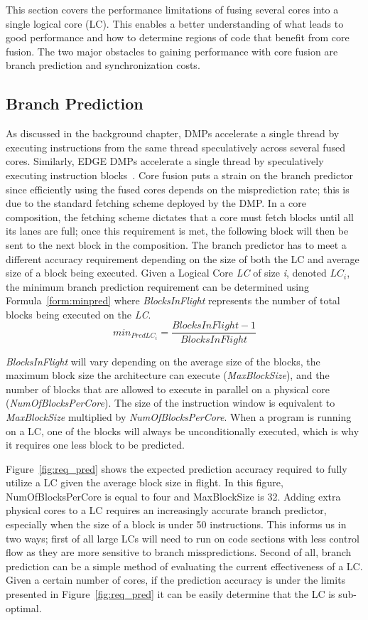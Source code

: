 This section covers the performance limitations of fusing several cores into a single logical core (LC).
This enables a better understanding of what leads to good performance and how to determine regions of code that benefit from core fusion.
The two major obstacles to gaining performance with core fusion are branch prediction and synchronization costs.

\subsection{Branch Prediction}

As discussed in the background chapter, DMPs accelerate a single thread by executing instructions from the same thread speculatively across several fused cores. 
Similarly, EDGE DMPs accelerate a single thread by speculatively executing instruction blocks~\cite{putnam2010e2}.
Core fusion puts a strain on the branch predictor since efficiently using the fused cores depends on the misprediction rate; this is due to the standard fetching scheme deployed by the DMP.
In a core composition, the fetching scheme dictates that a core must fetch blocks until all its lanes are full; once this requirement is met, the following block will then be sent to the next block in the composition.
The branch predictor has to meet a different accuracy requirement depending on the size of both the LC and average size of a block being executed.
Given a Logical Core \textit{LC} of size \textit{i}, denoted \textit{$LC_i$}, the minimum branch prediction requirement can be determined using Formula~\ref{form:minpred} where \textit{BlocksInFlight} represents the number of total blocks being executed on the \textit{LC}.
\begin{equation}\label{form:minpred}
min_{PredLC_i }= \frac{BlocksInFlight - 1}{BlocksInFlight}
\end{equation}

\textit{BlocksInFlight} will vary depending on the average size of the blocks, the maximum block size the architecture can execute (\textit{MaxBlockSize}), and the number of blocks 
that are allowed to execute in parallel on a physical core (\textit{NumOfBlocksPerCore}). 
The size of the instruction window is equivalent to \textit{MaxBlockSize} multiplied by \textit{NumOfBlocksPerCore}.
When a program is running on a LC, one of the blocks will always be unconditionally executed, which is why it requires one less block to be predicted.

Figure~\ref{fig:req_pred} shows the expected prediction accuracy required to fully utilize a LC given the average block size in flight.
In this figure, NumOfBlocksPerCore is equal to four and MaxBlockSize is 32.
Adding extra physical cores to a LC requires an increasingly accurate branch predictor, especially when the size of a block is under 50 instructions.
This informs us in two ways; first of all large LCs will need to run on code sections with less control flow as they are more sensitive to branch misspredictions.
Second of all, branch prediction can be a simple method of evaluating the current effectiveness of a LC.
Given a certain number of cores, if the prediction accuracy is under the limits presented in Figure~\ref{fig:req_pred} it can be easily determine that the LC is sub-optimal.

